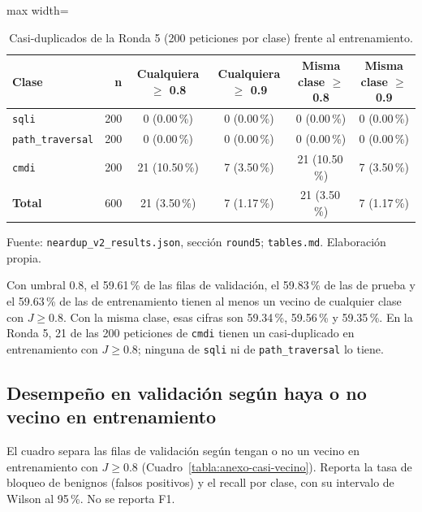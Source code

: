 \begin{table}[htbp]
\centering
\footnotesize
\setlength{\tabcolsep}{3pt}
\begin{adjustbox}{max width=\linewidth}
\begin{tabular}{|l|r|c|c|c|c|}
\hline
\textbf{Clase} & \textbf{n} & \textbf{Cualquiera $\geq$ 0.8} & \textbf{Cualquiera $\geq$ 0.9} & \textbf{Misma clase $\geq$ 0.8} & \textbf{Misma clase $\geq$ 0.9} \\ \hline
\texttt{sqli} & 200 & 0 (0.00\,\%) & 0 (0.00\,\%) & 0 (0.00\,\%) & 0 (0.00\,\%) \\ \hline
\texttt{path\_traversal} & 200 & 0 (0.00\,\%) & 0 (0.00\,\%) & 0 (0.00\,\%) & 0 (0.00\,\%) \\ \hline
\texttt{cmdi} & 200 & 21 (10.50\,\%) & 7 (3.50\,\%) & 21 (10.50\,\%) & 7 (3.50\,\%) \\ \hline
\textbf{Total} & 600 & 21 (3.50\,\%) & 7 (1.17\,\%) & 21 (3.50\,\%) & 7 (1.17\,\%) \\ \hline
\end{tabular}
\end{adjustbox}
\caption{Casi-duplicados de la Ronda 5 (200 peticiones por clase) frente al entrenamiento.}
\label{tabla:anexo-casi-ronda5}
\par\smallskip\footnotesize Fuente: \texttt{neardup\_v2\_results.json}, sección \texttt{round5}; \texttt{tables.md}. Elaboración propia.
\end{table}

Con umbral 0.8, el 59.61\,\% de las filas de validación, el 59.83\,\% de las de prueba y el 59.63\,\% de las de entrenamiento tienen al menos un vecino de cualquier clase con $J \geq 0.8$. Con la misma clase, esas cifras son 59.34\,\%, 59.56\,\% y 59.35\,\%. En la Ronda 5, 21 de las 200 peticiones de \texttt{cmdi} tienen un casi-duplicado en entrenamiento con $J \geq 0.8$; ninguna de \texttt{sqli} ni de \texttt{path\_traversal} lo tiene.

\subsection{Desempeño en validación según haya o no vecino en entrenamiento}\label{anexo:casi-validacion-vecino}

El cuadro separa las filas de validación según tengan o no un vecino en entrenamiento con $J \geq 0.8$ (Cuadro~\ref{tabla:anexo-casi-vecino}). Reporta la tasa de bloqueo de benignos (falsos positivos) y el recall por clase, con su intervalo de Wilson al 95\,\%. No se reporta F1.

